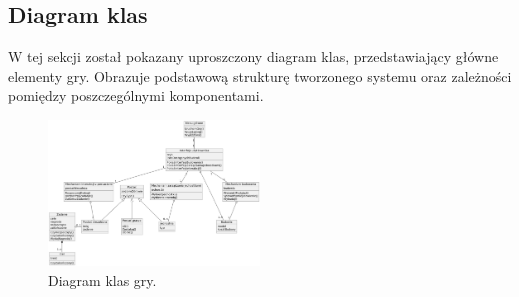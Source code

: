 \subsection{Diagram klas}\label{ss:class}
W tej sekcji został pokazany uproszczony diagram klas, przedstawiający główne elementy gry. Obrazuje podstawową
strukturę tworzonego systemu oraz zależności pomiędzy poszczególnymi komponentami.
\begin{figure}[htbp]
    \centering
    \includegraphics[width=0.5\textwidth]{images/diagrams/class.png}
    \caption{Diagram klas gry.}\label{fig:classes}
\end{figure}